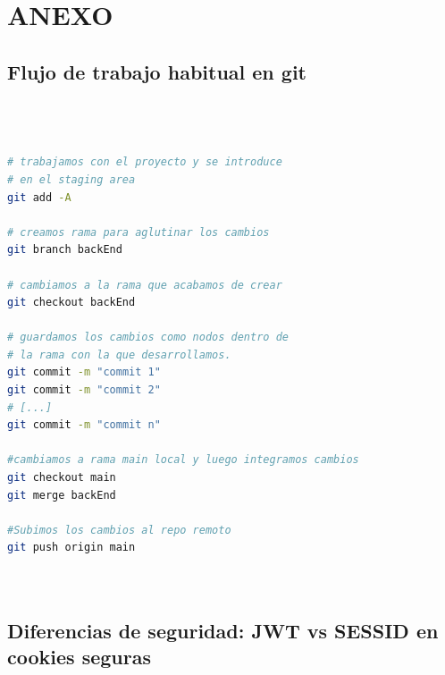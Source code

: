 \documentclass[a4paper,12pt]{report}
\begin{document}
	
	\chapter{ANEXO}
	\label{chap:anexo} %
		
			
		\section{Flujo de trabajo habitual en git}
		\label{sec:anexoFlujoGit}
		
\begin{lstlisting}[language=bash, basicstyle=\ttfamily\small]
	


# trabajamos con el proyecto y se introduce
# en el staging area
git add -A 

# creamos rama para aglutinar los cambios
git branch backEnd

# cambiamos a la rama que acabamos de crear
git checkout backEnd

# guardamos los cambios como nodos dentro de
# la rama con la que desarrollamos.	
git commit -m "commit 1"  	
git commit -m "commit 2"
# [...]
git commit -m "commit n"

#cambiamos a rama main local y luego integramos cambios
git checkout main
git merge backEnd

#Subimos los cambios al repo remoto
git push origin main 

	
\end{lstlisting}
		
	
\pagebreak

		
		
		\section{Diferencias de seguridad: JWT vs SESSID en cookies seguras}
		\label{sec:anexo_JWTvsSESSIONS}
						
\end{document}
